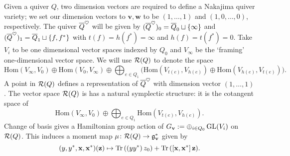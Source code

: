 \documentclass{amsart}
\theoremstyle{definition}
\renewcommand{\Tr}{\textup{Tr}\,}
\begin{document}
Given a quiver $Q$, two dimension vectors are required to define a Nakajima quiver variety; we set our dimension vectors to $\mathbf{v}, \mathbf{w}$ to be $(1,\dots,1)$ and $(1,0,\ldots, 0)$, respectively.
The quiver ${\overline{Q}}^\heartsuit$ will be given by $({\overline{Q}}^\heartsuit)_0 = {\overline{Q}}_0 \sqcup \{\infty\}$ and $({\overline{Q}}^\heartsuit)_1 = {\overline{Q}}_1 \sqcup \{f,f^*\}$ with $t(f) = h(f^*) = \infty$ and $h(f) = t(f^*) = 0$.
Take $V_i$ to be one dimensional vector spaces indexed by $Q_0$ and $V_\infty$ be the `framing' one-dimensional vector space. 
We will use $\mathcal{R}(Q)$ to denote the space $$\text{Hom}(V_\infty, V_0) \oplus \text{Hom}(V_0, V_\infty) \oplus \bigoplus_{e \in Q_1}\big(\text{Hom}(V_{t(e)}, V_{h(e)}) \oplus \text{Hom}(V_{h(e)}, V_{t(e)})\big).$$
A point in $\mathcal{R}(Q)$ defines a representation of ${\overline{Q}}^\heartsuit$ with dimension vector $(1,\ldots,1)$.
The vector space $\mathcal{R}(Q)$ is has a natural symplectic structure: it is the cotangent space of $$\text{Hom}(V_\infty, V_0) \oplus \bigoplus_{e \in Q_1}\text{Hom}(V_{t(e)}, V_{h(e)}).$$
Change of basis gives a Hamiltonian group action of $G_\mathbf{v}:= \oplus_{i \in Q_0} \operatorname{GL}(V_i)$ on $\mathcal{R}(Q)$. 
This induces a moment map $\mu \colon \mathcal{R}(Q) \rightarrow \mathfrak{g}_{\mathbf{v}}^*$ given by $$(y,y^*,\bfx,\bfx^*)(\bfz) \mapsto  \Tr((yy^*)\,z_0) + \Tr([\bfx,\bfx^*]\,\bfz).$$
\end{document}

